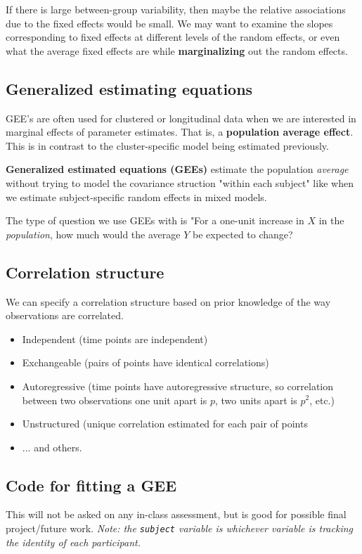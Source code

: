 \documentclass[titlepage, 12pt, leqno]{article}
\begin{document}
If there is large between-group variability, then maybe the relative associations due to 
the fixed effects would be small. We may want to examine the slopes corresponding to
fixed effects at different levels of the random effects, or even what the average fixed
effects are while \textbf{marginalizing} out the random effects.

\subsection{Generalized estimating equations}
GEE's are often used for clustered or longitudinal data when we are interested in marginal
effects of parameter estimates. That is, a \textbf{population average effect}. This is in
contrast to the cluster-specific model being estimated previously.

\begin{definition}
    \textbf{Generalized estimated equations (GEEs)} estimate the population
    \textit{average} without trying to model the covariance struction "within each subject"
    like when we estimate subject-specific random effects in mixed models.
\end{definition}

The type of question we use GEEs with is "For a one-unit increase in $X$ in the
\textit{population}, how much would the average $Y$ be expected to change?

\subsection{Correlation structure}
We can specify a correlation structure based on prior knowledge of the way observations
are correlated.
\begin{itemize}
    \item Independent (time points are independent)
    \item Exchangeable (pairs of points have identical correlations)
    \item Autoregressive (time points have autoregressive structure, so correlation
        between two observations one unit apart is $p$, two units apart is $p^2$, etc.)
    \item Unstructured (unique correlation estimated for each pair of points
    \item ... and others.
\end{itemize}

\pagebreak
\subsection{Code for fitting a GEE}
This will not be asked on any in-class assessment, but is good for possible final
project/future work. \textit{Note: the \texttt{subject} variable is whichever variable
is tracking the identity of each participant.}
\end{document}
